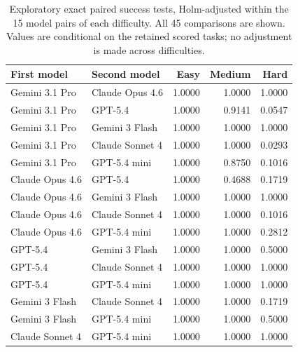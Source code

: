 \begin{table}[ht]
\caption{Exploratory exact paired success tests, Holm-adjusted within the 15 model pairs of each difficulty. All 45 comparisons are shown. Values are conditional on the retained scored tasks; no adjustment is made across difficulties.}
\centering\small
\begin{tabular}{@{}llrrr@{}}
\toprule
First model & Second model & Easy & Medium & Hard\\
\midrule
Gemini 3.1 Pro & Claude Opus 4.6 & 1.0000 & 1.0000 & 1.0000\\
Gemini 3.1 Pro & GPT-5.4 & 1.0000 & 0.9141 & 0.0547\\
Gemini 3.1 Pro & Gemini 3 Flash & 1.0000 & 1.0000 & 1.0000\\
Gemini 3.1 Pro & Claude Sonnet 4 & 1.0000 & 1.0000 & 0.0293\\
Gemini 3.1 Pro & GPT-5.4 mini & 1.0000 & 0.8750 & 0.1016\\
Claude Opus 4.6 & GPT-5.4 & 1.0000 & 0.4688 & 0.1719\\
Claude Opus 4.6 & Gemini 3 Flash & 1.0000 & 1.0000 & 1.0000\\
Claude Opus 4.6 & Claude Sonnet 4 & 1.0000 & 1.0000 & 0.1016\\
Claude Opus 4.6 & GPT-5.4 mini & 1.0000 & 1.0000 & 0.2812\\
GPT-5.4 & Gemini 3 Flash & 1.0000 & 1.0000 & 0.5000\\
GPT-5.4 & Claude Sonnet 4 & 1.0000 & 1.0000 & 1.0000\\
GPT-5.4 & GPT-5.4 mini & 1.0000 & 1.0000 & 1.0000\\
Gemini 3 Flash & Claude Sonnet 4 & 1.0000 & 1.0000 & 0.1719\\
Gemini 3 Flash & GPT-5.4 mini & 1.0000 & 1.0000 & 0.5000\\
Claude Sonnet 4 & GPT-5.4 mini & 1.0000 & 1.0000 & 1.0000\\
\bottomrule
\end{tabular}
\end{table}
